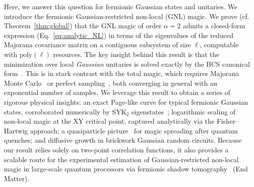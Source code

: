 \documentclass[aps,prl,twocolumn,superscriptaddress,reprint,longbibliography,nofootinbib]{revtex4-2}
\newcommand{\RENYI}{\alpha}
\begin{document}
Here, we answer this question for fermionic Gaussian states and unitaries. We introduce the fermionic Gaussian-restricted non-local (GNL) magic.
We prove (cf. Theorem~\ref{thm:global}) that the GNL magic of order $\RENYI=2$ admits a closed-form expression (Eq.~\eqref{eq:analytic_NL}) in terms of the eigenvalues of the reduced Majorana covariance matrix on a contiguous subsystem of size $\ell$, computable with $\mathrm{poly}(\ell)$ resources.
The key insight behind this result is that the minimization over local \emph{Gaussian} unitaries is solved exactly by the BCS canonical form~\cite{BoteroReznik2004}.
This is in stark contrast with the total magic, which requires Majorana Monte Carlo~\cite{Bera_2025} or perfect sampling~\cite{collura2026nonstabilizernessfermionicgaussianstates}, both converging in general with an exponential number of samples.
We leverage this result to obtain a series of rigorous physical insights: an exact Page-like curve for typical fermionic Gaussian states, corroborated numerically by SYK$_2$ eigenstates~\cite{Bera_2025,santra2025complexitytransitionschaoticquantum,jasser2025stabilizer, malvimat2026multipartitenonlocalmagicsyk, njgn-fksh}; logarithmic scaling of non-local magic at the XY critical point, captured analytically via the Fisher--Hartwig approach; a quasiparticle picture~\cite{calabrese2009} for magic spreading after quantum quenches; and diffusive growth in brickwork Gaussian random circuits.
Because our result relies solely on two-point correlation functions, it also provides a scalable route for the experimental estimation of Gaussian-restricted non-local magic in large-scale quantum processors via fermionic shadow tomography~\cite{Wan_2023} (End Matter).
\end{document}
